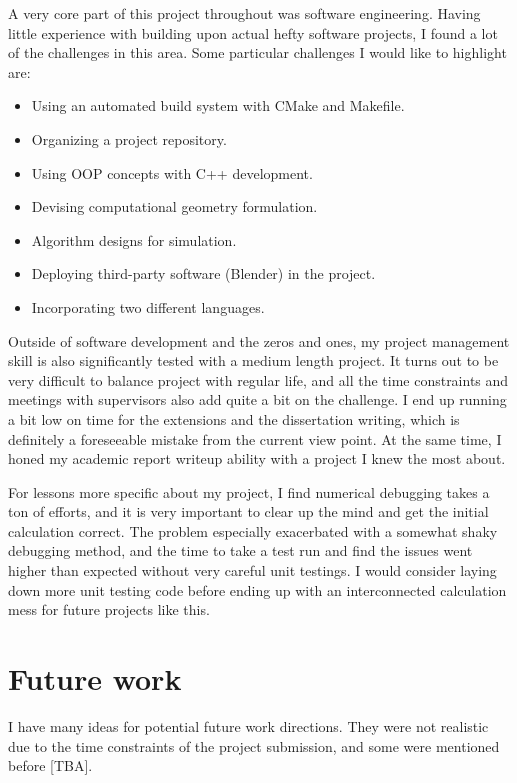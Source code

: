 \documentclass[12pt,a4paper,twoside,openright]{report}
\begin{document}
A very core part of this project throughout was software engineering. Having little experience with building upon actual hefty software projects, I found a lot of the challenges in this area. Some particular challenges I would like to highlight are:
\begin{itemize}
\item Using an automated build system with CMake and Makefile.
\item Organizing a project repository.
\item Using OOP concepts with C++ development.
\item Devising computational geometry formulation.
\item Algorithm designs for simulation.
\item Deploying third-party software (Blender) in the project.
\item Incorporating two different languages.
\end{itemize}

Outside of software development and the zeros and ones, my project management skill is also significantly tested with a medium length project. It turns out to be very difficult to balance project with regular life, and all the time constraints and meetings with supervisors also add quite a bit on the challenge. I end up running a bit low on time for the extensions and the dissertation writing, which is definitely a foreseeable mistake from the current view point. At the same time, I honed my academic report writeup ability with a project I knew the most about.

For lessons more specific about my project, I find numerical debugging takes a ton of efforts, and it is very important to clear up the mind and get the initial calculation correct. The problem especially exacerbated with a somewhat shaky debugging method, and the time to take a test run and find the issues went higher than expected without very careful unit testings. I would consider laying down more unit testing code before ending up with an interconnected calculation mess for future projects like this.

\section{Future work}

I have many ideas for potential future work directions. They were not realistic due to the time constraints of the project submission, and some were mentioned before [TBA].
\end{document}
